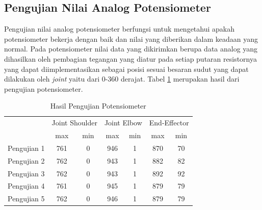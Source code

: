 \subsection{Pengujian Nilai Analog Potensiometer}
Pengujian nilai analog potensiometer berfungsi untuk mengetahui apakah potensiometer bekerja dengan baik dan nilai yang diberikan dalam keadaan yang normal. Pada potensiometer nilai data yang dikirimkan berupa data analog yang dihasilkan oleh pembagian tegangan yang diatur pada setiap putaran resistornya yang dapat diimplementasikan sebagai posisi sesuai besaran sudut yang dapat dilakukan oleh \textit{joint} yaitu dari 0-360 derajat. Tabel \ref{tbl.potensiometer} merupakan hasil dari pengujian potensiometer.

\begin{table}[H]
	\centering
	\caption{Hasil Pengujian Potensiometer}
	\label{tbl.potensiometer}
	\begin{tabular}{|c|c|c|c|c|c|c|}
		\hline
		\rowcolor[HTML]{9B9B9B} 
		\cellcolor[HTML]{9B9B9B}                            & \multicolumn{2}{c|}{\cellcolor[HTML]{9B9B9B}Joint Shoulder} & \multicolumn{2}{c|}{\cellcolor[HTML]{9B9B9B}Joint Elbow} & \multicolumn{2}{c|}{\cellcolor[HTML]{9B9B9B}End-Effector} \\ \cline{2-7} 
		\rowcolor[HTML]{9B9B9B} 
		\multirow{-2}{*}{\cellcolor[HTML]{9B9B9B}Pengujian} & max                          & min                          & max                         & min                        & max                         & min                         \\ \hline
		Pengujian 1                                         & 761                          & 0                            & 946                         & 1                          & 870                         & 70                          \\ \hline
		Pengujian 2                                         & 762                          & 0                            & 943                         & 1                          & 882                         & 82                          \\ \hline
		Pengujian 3                                         & 762                          & 0                            & 943                         & 1                          & 892                         & 92                          \\ \hline
		Pengujian 4                                         & 761                          & 0                            & 945                         & 1                          & 879                         & 79                          \\ \hline
		Pengujian 5                                         & 762                          & 0                            & 946                         & 1                          & 879                         & 79                          \\ \hline
	\end{tabular}
\end{table} 



